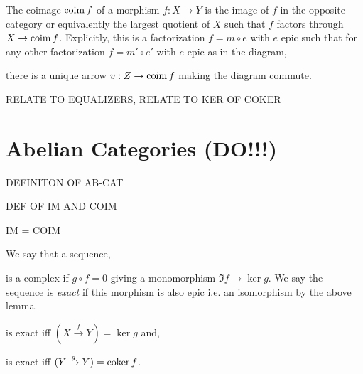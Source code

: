 \documentclass[12pt]{article}
\begin{document}
\begin{defn}
The coimage $\operatorname{\mathrm{coim}}{f}$ of a morphism $f : X \to Y$ is the image of $f$ in the opposite category or equivalently the largest quotient of $X$ such that $f$ factors through $X \to \operatorname{\mathrm{coim}}{f}$. Explicitly, this is a factorization $f = m \circ e$ with $e$ epic such that for any other factorization $f = m' \circ e'$ with $e$ epic as in the diagram,
\begin{center}
\end{center}
there is a unique arrow $v : Z \to \operatorname{\mathrm{coim}}{f}$ making the diagram commute.
\end{defn}


RELATE TO EQUALIZERS, RELATE TO KER OF COKER

\section{Abelian Categories (DO!!!)} 


DEFINITON OF AB-CAT

DEF OF IM AND COIM

IM = COIM

\begin{definition}
We say that a sequence,
\begin{center}
\end{center}
is a complex if $g \circ f = 0$ giving a monomorphism $\Im{f} \to \ker{g}$. We say the sequence is \textit{exact} if this morphism is also epic i.e. an isomorphism by the above lemma. 
\end{definition}

\begin{proposition}
\begin{center}
\end{center}
is exact iff $(X \xrightarrow{f} Y) = \ker{g}$ and, 
\begin{center}
\end{center}
is exact iff $(Y \xrightarrow{g} Y) = \operatorname{\mathrm{coker}}{f}$. 
\end{proposition}
\end{document}
